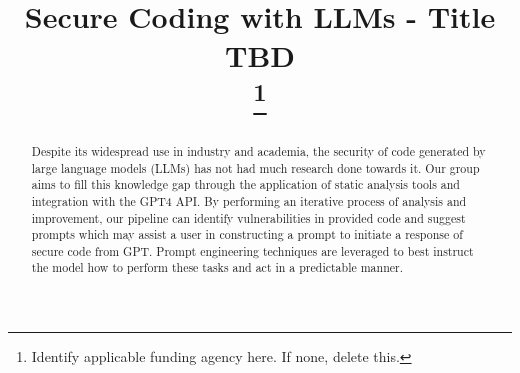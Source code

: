 \documentclass[conference]{IEEEtran}
\newcommand{\corey}[1]{\textsf{\color{blue}{[{Corey: #1}]}}}
\begin{document}
\title{Secure Coding with LLMs - Title TBD\\

\thanks{Identify applicable funding agency here. If none, delete this.}
}

\author{
\and
{}
\and
{}
\and
{}
\and
{}
\and
{}
}

\maketitle

\begin{abstract}
Despite its widespread use in industry and academia, the security of code generated by large language models (LLMs) has not had much research done towards it. Our group aims to fill this knowledge gap through the application of static analysis tools and integration with the GPT4 API. By performing an iterative process of analysis and improvement, our pipeline can identify vulnerabilities in provided code and suggest prompts which may assist a user in constructing a prompt to initiate a response of secure code from GPT. Prompt engineering techniques are leveraged to best instruct the model how to perform these tasks and act in a predictable manner.

\corey {DO THE ABSTRACT LAST}
\end{abstract}
\end{document}

